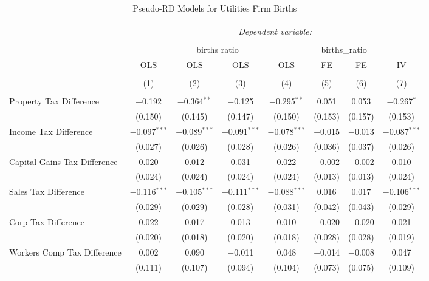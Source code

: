 
\begin{table}[!htbp] \centering 
  \caption{Pseudo-RD Models for  Utilities Firm Births} 
  \label{} 
\begin{tabular}{@{\extracolsep{5pt}}lccccccc} 
\\[-1.8ex]\hline 
\hline \\[-1.8ex] 
 & \multicolumn{7}{c}{\textit{Dependent variable:}} \\ 
\cline{2-8} 
\\[-1.8ex] & \multicolumn{4}{c}{births ratio} & \multicolumn{2}{c}{births\_ratio} &   \\ 
 & OLS & OLS & OLS & OLS & FE & FE & IV \\ 
\\[-1.8ex] & (1) & (2) & (3) & (4) & (5) & (6) & (7)\\ 
\hline \\[-1.8ex] 
 Property Tax Difference & $-$0.192 & $-$0.364$^{**}$ & $-$0.125 & $-$0.295$^{**}$ & 0.051 & 0.053 & $-$0.267$^{*}$ \\ 
  & (0.150) & (0.145) & (0.147) & (0.150) & (0.153) & (0.157) & (0.153) \\ 
  Income Tax Difference & $-$0.097$^{***}$ & $-$0.089$^{***}$ & $-$0.091$^{***}$ & $-$0.078$^{***}$ & $-$0.015 & $-$0.013 & $-$0.087$^{***}$ \\ 
  & (0.027) & (0.026) & (0.028) & (0.026) & (0.036) & (0.037) & (0.026) \\ 
  Capital Gains Tax Difference & 0.020 & 0.012 & 0.031 & 0.022 & $-$0.002 & $-$0.002 & 0.010 \\ 
  & (0.024) & (0.024) & (0.024) & (0.024) & (0.013) & (0.013) & (0.024) \\ 
  Sales Tax Difference & $-$0.116$^{***}$ & $-$0.105$^{***}$ & $-$0.111$^{***}$ & $-$0.088$^{***}$ & 0.016 & 0.017 & $-$0.106$^{***}$ \\ 
  & (0.029) & (0.029) & (0.028) & (0.031) & (0.042) & (0.043) & (0.029) \\ 
  Corp Tax Difference & 0.022 & 0.017 & 0.013 & 0.010 & $-$0.020 & $-$0.020 & 0.021 \\ 
  & (0.020) & (0.018) & (0.020) & (0.018) & (0.028) & (0.028) & (0.019) \\ 
  Workers Comp Tax Difference & 0.002 & 0.090 & $-$0.011 & 0.048 & $-$0.014 & $-$0.008 & 0.047 \\ 
  & (0.111) & (0.107) & (0.094) & (0.104) & (0.073) & (0.075) & (0.109) \\ 

\end{tabular}
\end{table}
